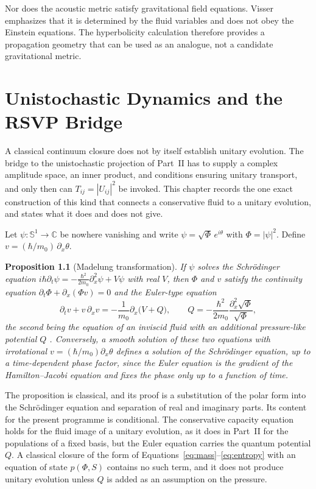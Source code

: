 \documentclass[11pt,oneside]{book}
\newtheorem{proposition}[theorem]{Proposition}
\theoremstyle{definition}
\theoremstyle{remark}
\begin{document}
Nor does the acoustic metric satisfy gravitational field equations. Visser \cite{visser1998} emphasizes that it is determined by the fluid variables and does not obey the Einstein equations. The hyperbolicity calculation therefore provides a propagation geometry that can be used as an analogue, not a candidate gravitational metric.

\chapter{Unistochastic Dynamics and the RSVP Bridge}\label{ch:bridge}

A classical continuum closure does not by itself establish unitary evolution. The bridge to the unistochastic projection of Part~II has to supply a complex amplitude space, an inner product, and conditions ensuring unitary transport, and only then can $T_{ij}=|U_{ij}|^2$ be invoked. This chapter records the one exact construction of this kind that connects a conservative fluid to a unitary evolution, and states what it does and does not give.

Let $\psi:\mathbb S^1\to\mathbb C$ be nowhere vanishing and write $\psi=\sqrt\Phi\,e^{i\theta}$ with $\Phi=|\psi|^2$. Define $v=(\hbar/m_0)\,\partial_x\theta$.

\begin{proposition}[Madelung transformation]\label{prop:madelung}
If $\psi$ solves the Schr\"odinger equation $i\hbar\partial_t\psi=-\tfrac{\hbar^2}{2m_0}\partial_x^2\psi+V\psi$ with real $V$, then $\Phi$ and $v$ satisfy the continuity equation $\partial_t\Phi+\partial_x(\Phi v)=0$ and the Euler-type equation
\[
\partial_tv+v\,\partial_xv=-\frac1{m_0}\partial_x\bigl(V+Q\bigr),\qquad Q=-\frac{\hbar^2}{2m_0}\frac{\partial_x^2\sqrt\Phi}{\sqrt\Phi},
\]
the second being the equation of an inviscid fluid with an additional pressure-like potential $Q$ \cite{madelung1927}. Conversely, a smooth solution of these two equations with irrotational $v=(\hbar/m_0)\partial_x\theta$ defines a solution of the Schr\"odinger equation, up to a time-dependent phase factor, since the Euler equation is the gradient of the Hamilton--Jacobi equation and fixes the phase only up to a function of time.
\end{proposition}

The proposition is classical, and its proof is a substitution of the polar form into the Schr\"odinger equation and separation of real and imaginary parts. Its content for the present programme is conditional. The conservative capacity equation holds for the fluid image of a unitary evolution, as it does in Part~II for the populations of a fixed basis, but the Euler equation carries the quantum potential $Q$. A classical closure of the form of Equations~\eqref{eq:mass}--\eqref{eq:entropy} with an equation of state $p(\Phi,S)$ contains no such term, and it does not produce unitary evolution unless $Q$ is added as an assumption on the pressure.
\end{document}
